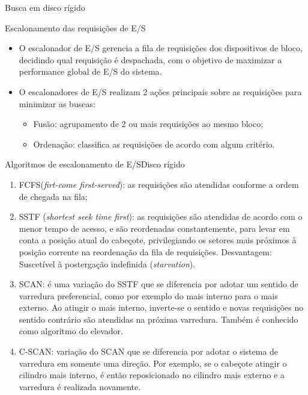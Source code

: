 \documentclass{beamer}
\begin{document}
\begin{frame}{Busca em disco rígido}
\begin{center}

\end{center}
\end{frame}

\begin{frame}{Escalonamento das requisições de E/S}
  
  \begin{itemize}
  \item O \alert{escalonador de E/S} gerencia a fila de requisições
    dos dispositivos de bloco, decidindo qual requisição é despachada,
    com o objetivo de maximizar a performance global de E/S do
    sistema.
  \item O escalonadores de E/S realizam 2 ações principais sobre as
    requisições para minimizar as buscas:
    \begin{itemize}
    \item \alert{Fusão}: agrupamento de 2 ou mais requisições ao mesmo bloco;
    \item \alert{Ordenação}: classifica as requisições de acordo com
      algum critério.
    \end{itemize}
  \end{itemize}
\end{frame}

\begin{frame}{Algoritmos de escalonamento de E/S}{Disco rígido}
  \footnotesize
  \begin{enumerate}[<+-| alert@+>]
  \item \alert{FCFS}({\em firt-come first-served}): as requisições são
    atendidas conforme a ordem de chegada na fila;
  \item \alert{SSTF} ({\em shortest seek time first}): as requisições
    são atendidas de acordo com o menor tempo de acesso, e são
    reordenadas constantemente, para levar em conta a posição atual do
    cabeçote, privilegiando os setores mais próximos à posição
    corrente na reordenação da fila de requisições.
    {\color{gray}\small Desvantagem: Suscetível à postergação
      indefinida ({\em starvation}).}
  \item \alert{SCAN}: é uma variação do SSTF que se diferencia por
    adotar um sentido de varredura preferencial, como por exemplo do
    mais interno para o mais externo. Ao atingir o mais interno,
    inverte-se o sentido e novas requisições no sentido contrário são
    atendidas na próxima varredura. Também é conhecido como algoritmo
    do \alert{elevador}.
  \item \alert{C-SCAN}: variação do SCAN que se diferencia por adotar
    o sistema de varredura em somente uma direção. Por exemplo, se o
    cabeçote atingir o cilindro mais interno, é então reposicionado
    no cilindro mais externo e a varredura é realizada novamente.
  \end{enumerate}

\end{frame}
\end{document}
